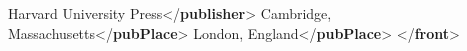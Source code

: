 \begin{shaded}
\hspace*{1em}\hspace*{1em}Harvard University Press{</\textbf{publisher}>}\mbox{}\newline 
\hspace*{1em}\hspace*{1em}Cambridge, Massachusetts{</\textbf{pubPlace}>}\mbox{}\newline 
\hspace*{1em}\hspace*{1em}London, England{</\textbf{pubPlace}>}\mbox{}\newline 
\hspace*{1em}\mbox{}\newline 
{}\mbox{}\newline 
{</\textbf{front}>}\end{shaded}\egroup\par \par
